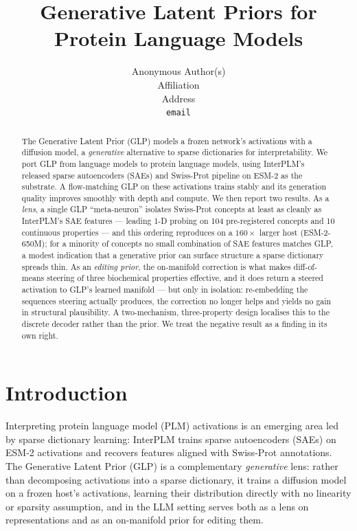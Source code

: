 \documentclass{article}
\title{Generative Latent Priors for Protein Language Models}
\author{%
  Anonymous Author(s) \\
  Affiliation \\
  Address \\
  \texttt{email} \\
}
\begin{document}
\maketitle

\begin{abstract}
The Generative Latent Prior (GLP) models a frozen network's activations with a diffusion model,
a \emph{generative} alternative to sparse dictionaries for interpretability. We port GLP from
language models to protein language models, using InterPLM's released sparse autoencoders (SAEs)
and Swiss-Prot pipeline on ESM-2 as the substrate. A flow-matching GLP on these activations
trains stably and its generation quality improves smoothly with depth and compute. We then
report two results. As a \emph{lens}, a single GLP ``meta-neuron'' isolates Swiss-Prot concepts
at least as cleanly as InterPLM's SAE features --- leading 1-D probing on 104 pre-registered
concepts and 10 continuous properties --- and this ordering reproduces on a $160\times$ larger
host (ESM-2-650M); for a minority of concepts no small combination of SAE features matches GLP,
a modest indication that a generative prior can surface structure a sparse dictionary spreads
thin. As an \emph{editing prior}, the on-manifold correction is what makes diff-of-means
steering of three biochemical properties effective, and it does return a steered activation to
GLP's learned manifold --- but only in isolation: re-embedding the sequences steering actually
produces, the correction no longer helps and yields no gain in structural plausibility. A
two-mechanism, three-property design localises this to the discrete decoder rather than the
prior. We treat the negative result as a finding in its own right.
\end{abstract}

\section{Introduction}

Interpreting protein language model (PLM) activations is an emerging area led by sparse
dictionary learning: InterPLM \cite{simon2024interplm} trains sparse autoencoders (SAEs) on
ESM-2 \cite{lin2023esm2} activations and recovers features aligned with Swiss-Prot annotations.
The Generative Latent Prior (GLP) \cite{luo2026glp} is a complementary \emph{generative} lens:
rather than decomposing activations into a sparse dictionary, it trains a diffusion model on a
frozen host's activations, learning their distribution directly with no linearity or sparsity
assumption, and in the LLM setting serves both as a lens on representations and as an
on-manifold prior for editing them.
\end{document}
